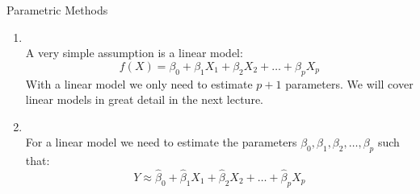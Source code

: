 \documentclass[mathserif, aspectratio=169]{beamer}
\begin{document}
\begin{frame}{Parametric Methods}
	\begin{cpage}
		\begin{enumerate}
			\item {}\\
				A very simple assumption is a linear model:
				\[ f(X) = \beta_0 + \beta_1 X_1 + \beta_2 X_2 + \dots + \beta_p X_p\]
				With a linear model we only need to estimate $p + 1$ parameters. 
				We will cover linear models in great detail in the next lecture.
			\item {}\\
				For a linear model we need to estimate the parameters 
				$\beta_0, \beta_1, \beta_2, \dots, \beta_p$ such that:
				\[ Y \approx \hat{\beta}_0 + \hat{\beta}_1 X_1 + \hat{\beta}_2 X_2 
				+ \dots + \hat{\beta}_p X_p \] 
		\end{enumerate}
	\end{cpage}
\end{frame}
\end{document}
